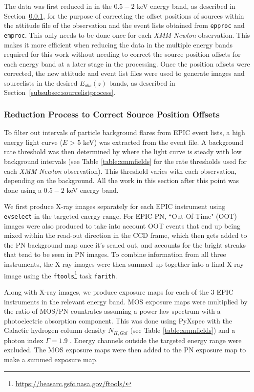 \documentclass[fleqn,usenatbib]{mnras}
\begin{document}
	The data was first reduced in in the $0.5-2$ keV energy band, as described in Section~\ref{subsubsec:reductionprocess}, for the purpose of correcting the offset positions of sources within the attitude file of the observation and the event lists obtained from \texttt{epproc} and \texttt{emproc}.
	This only needs to be done once for each \textit{XMM-Newton} observation.
	This makes it more efficient when reducing the data in the multiple energy bands required for this work without needing to correct the source position offsets for each energy band at a later stage in the processing.
	Once the position offsets were corrected, the new attitude and event list files were used to generate images and sourcelists in the desired $E_{obs}(z)$ bands, as described in Section~\ref{subsubsec:sourcelistprocess}.
    
    
    
        \subsubsection{Reduction Process to Correct Source Position Offsets}\label{subsubsec:reductionprocess}
    
    	To filter out intervals of particle background flares from EPIC event lists, a high energy light curve ($E$ > 5 keV) was extracted from the event file. 
    	A background rate threshold was then determined by where the light curve is steady with low background intervals (see Table \ref{table:xmmfields} for the rate thresholds used for each \textit{XMM-Newton} observation).
    	This threshold varies with each observation, depending on the background.
    	All the work in this section after this point was done using a $0.5-2$ keV energy band.
    	
    	We first produce X-ray images separately for each EPIC instrument using \texttt{evselect} in the targeted energy range.
    	For EPIC-PN, ``Out-Of-Time" (OOT) images were also produced to take into account OOT events that end up being mixed within the read-out direction in the CCD frame, which then gets added to the PN background map once it's scaled out, and accounts for the bright streaks that tend to be seen in PN images.    	
    	To combine information from all three instruments, the X-ray images were then summed up together into a final X-ray image using the \texttt{ftools}\footnote{\url{https://heasarc.gsfc.nasa.gov/ftools/}} task \texttt{farith}.
    	
    	Along with X-ray images, we produce exposure maps for each of the 3 EPIC instruments in the relevant energy band.
    	MOS exposure maps were multiplied by the ratio of MOS/PN countrates assuming a power-law spectrum with a photoelectric absorption component.
    	This was done using PyXspec with the Galactic hydrogen column density $N_{H,Gal}$ (see Table \ref{table:xmmfields}) and a photon index $\Gamma = 1.9$ \citep{mateos2005x}.
    	Energy channels outside the targeted energy range were excluded.
    	The MOS exposure maps were then added to the PN exposure map to make a summed exposure map.
\end{document}
